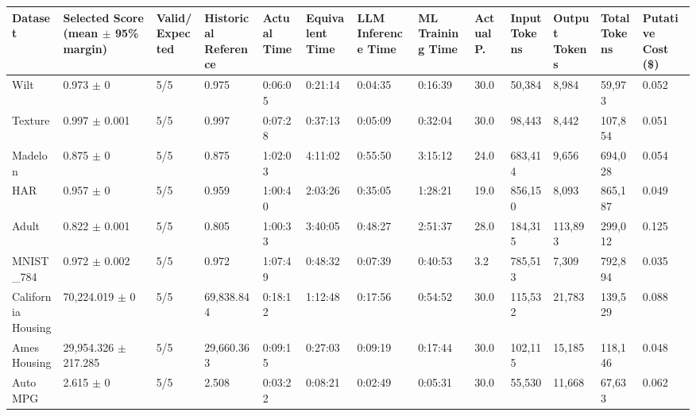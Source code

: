\begin{tabular}{lllllllllllll}
\hline
Dataset & Selected Score (mean \ensuremath{\pm} 95\% margin) & Valid/Expected & Historical Reference & Actual Time & Equivalent Time & LLM Inference Time & ML Training Time & Actual P. & Input Tokens & Output Tokens & Total Tokens & Putative Cost (\$) \\
\hline
Wilt & 0.973 \ensuremath{\pm} 0 & 5/5 & 0.975 & 0:06:05 & 0:21:14 & 0:04:35 & 0:16:39 & 30.0 & 50,384 & 8,984 & 59,973 & 0.052 \\
Texture & 0.997 \ensuremath{\pm} 0.001 & 5/5 & 0.997 & 0:07:28 & 0:37:13 & 0:05:09 & 0:32:04 & 30.0 & 98,443 & 8,442 & 107,854 & 0.051 \\
Madelon & 0.875 \ensuremath{\pm} 0 & 5/5 & 0.875 & 1:02:03 & 4:11:02 & 0:55:50 & 3:15:12 & 24.0 & 683,414 & 9,656 & 694,028 & 0.054 \\
HAR & 0.957 \ensuremath{\pm} 0 & 5/5 & 0.959 & 1:00:40 & 2:03:26 & 0:35:05 & 1:28:21 & 19.0 & 856,150 & 8,093 & 865,187 & 0.049 \\
Adult & 0.822 \ensuremath{\pm} 0.001 & 5/5 & 0.805 & 1:00:33 & 3:40:05 & 0:48:27 & 2:51:37 & 28.0 & 184,315 & 113,893 & 299,012 & 0.125 \\
MNIST\_784 & 0.972 \ensuremath{\pm} 0.002 & 5/5 & 0.972 & 1:07:49 & 0:48:32 & 0:07:39 & 0:40:53 & 3.2 & 785,513 & 7,309 & 792,894 & 0.035 \\
California Housing & 70,224.019 \ensuremath{\pm} 0 & 5/5 & 69,838.844 & 0:18:12 & 1:12:48 & 0:17:56 & 0:54:52 & 30.0 & 115,532 & 21,783 & 139,529 & 0.088 \\
Ames Housing & 29,954.326 \ensuremath{\pm} 217.285 & 5/5 & 29,660.363 & 0:09:15 & 0:27:03 & 0:09:19 & 0:17:44 & 30.0 & 102,115 & 15,185 & 118,146 & 0.048 \\
Auto MPG & 2.615 \ensuremath{\pm} 0 & 5/5 & 2.508 & 0:03:22 & 0:08:21 & 0:02:49 & 0:05:31 & 30.0 & 55,530 & 11,668 & 67,633 & 0.062 \\
\hline
\end{tabular}
